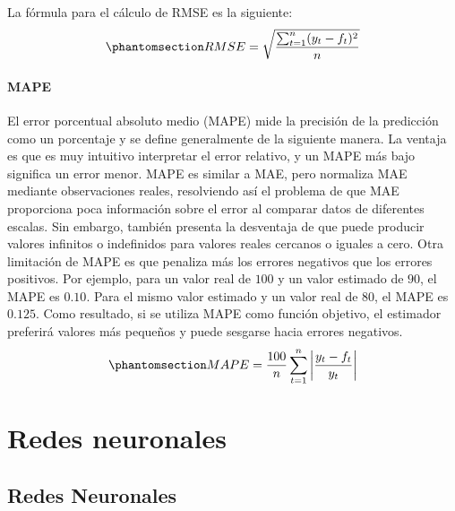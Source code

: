 \documentclass[
  us-letterpaper,
]{scrreprt}
\theoremstyle{definition}
\theoremstyle{plain}
\theoremstyle{plain}
\theoremstyle{definition}
\theoremstyle{remark}
\begin{document}
La fórmula para el cálculo de RMSE es la siguiente:
\begin{equation}\phantomsection\label{eq-RMSE}{RMSE= \sqrt{\frac{\sum_{t=1}^n (y_t-f_t)^2}{n}}}\end{equation}

\subsection{MAPE}\label{mape}

El error porcentual absoluto medio (MAPE) mide la precisión de la
predicción como un porcentaje y se define generalmente de la siguiente
manera. La ventaja es que es muy intuitivo interpretar el error
relativo, y un MAPE más bajo significa un error menor. MAPE es similar a
MAE, pero normaliza MAE mediante observaciones reales, resolviendo así
el problema de que MAE proporciona poca información sobre el error al
comparar datos de diferentes escalas. Sin embargo, también presenta la
desventaja de que puede producir valores infinitos o indefinidos para
valores reales cercanos o iguales a cero. Otra limitación de MAPE es que
penaliza más los errores negativos que los errores positivos. Por
ejemplo, para un valor real de \(100\) y un valor estimado de \(90\), el
MAPE es \(0.10\). Para el mismo valor estimado y un valor real de
\(80\), el MAPE es \(0.125\). Como resultado, si se utiliza MAPE como
función objetivo, el estimador preferirá valores más pequeños y puede
sesgarse hacia errores negativos.
\begin{equation}\phantomsection\label{eq-MAPE}{MAPE=\frac{100}{n}\sum_{t=1}^n \left| \frac{y_t-f_t}{y_t}\right|}\end{equation}

\part{Redes neuronales}

\chapter{Redes Neuronales}\label{redes-neuronales-1}
\end{document}
